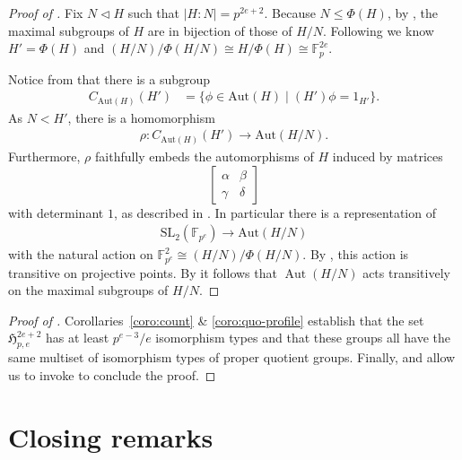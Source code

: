 \documentclass{toc}
\numberwithin{equation}{section}
\theoremstyle{plain}       %
\theoremstyle{remark}
\theoremstyle{definition}
\numberwithin{figure}{section}
\numberwithin{table}{section}
\newcommand{\mygroups}{\mathfrak{H}}
\newcommand{\bbF}{\mathbb{F}}  %
\DeclareMathOperator{\Aut}{Aut}  %
\begin{document}
\begin{proof}[Proof of ]
	Fix $N\lhd H$ such that $|H:N|=p^{2e+2}$.  Because $N\leq \Phi(H)$, by
	, the maximal subgroups of $H$ are in bijection of
	those of $H/N$.  Following  we know
	$H'=\Phi(H)$ and $(H/N)/\Phi(H/N)\cong H/\Phi(H)\cong\bbF_{p}^{2e}$.  
	
	Notice from  that there is a subgroup
	\begin{align*}
		C_{\mathrm{Aut}(H)}(H') & = \{ \phi\in \mathrm{Aut}(H)
			\mid (H')\phi=1_{H'}\}.
	\end{align*}
	As $N<H'$, there is a homomorphism
	\begin{align*}
		\rho:C_{\mathrm{Aut}(H)}(H')\to \mathrm{Aut}(H/N).
	\end{align*}
Furthermore, $\rho$ faithfully embeds the automorphisms of $H$ induced by
matrices
\[
  \begin{bmatrix} \alpha & \beta \\ \gamma & \delta\end{bmatrix}
\]
with
determinant $1$, as described in .  In particular there
is a representation of 
	\begin{align*}
		\mathrm{SL}_2(\bbF_{p^e}) \to \mathrm{Aut}(H/N)
	\end{align*}
	with the natural action on $\bbF_{p^e}^2\cong (H/N)/\Phi(H/N)$. By
	, this action is transitive on projective points.
	By  it follows that $\Aut(H/N)$ acts transitively on
	the maximal subgroups of $H/N$.
\end{proof}


\begin{proof}[Proof of ]
Corollaries~\ref{coro:count} \& \ref{coro:quo-profile} establish that the set
$\mygroups_{p,e}^{2e+2}$  has at  least $p^{e-3}/e$ isomorphism types and that
these groups all have the same multiset of isomorphism types of proper quotient
groups.  Finally,  and  allow
us to invoke  to conclude the proof.
\end{proof}

\section{Closing remarks}
\end{document}
